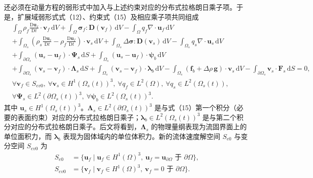 \documentclass[UTF8,11pt,a4paper]{ctexart}
\newcommand{\dd}{\,\mathrm{d}}
\newcommand{\D}{\mathrm{D}}
\begin{document}
还必须在动量方程的弱形式中加入与上述约束对应的分布式拉格朗日乘子项。于是，扩展域弱形式式（12）、约束式（15）及相应乘子项共同组成
\begin{align}
&\int_{\Omega}\rho_f\frac{\D\bm u_f}{\D t}\cdot\bm v_f\dd V
+\int_{\Omega}\bm\sigma_f:\bm D(\bm v_f)\dd V
-\int_{\Omega}q_f\nabla\cdot\bm u_f\dd V \nonumber\\
&+\int_{\Omega_s}\left(\rho_s\frac{\D\bm u_s}{\D t}-\rho_f\frac{\D\bm u_f}{\D t}\right)\cdot\bm v_s\dd V
+\int_{\Omega_s}\Delta\bm\sigma:\bm D(\bm v_s)\dd V
-\int_{\Omega_s}q_s\nabla\cdot\bm u_s\dd V \nonumber\\
&+\int_{\partial\Omega_s}(\bm u_s-\bm u_f)\cdot\bm\Psi_s\dd S
+\int_{\Omega_s}(\bm u_s-\bm u_f)\cdot\bm\psi_b\dd V \\[-0.3em]
&+\int_{\partial\Omega_s}(\bm v_s-\bm v_f)\cdot\bm\Lambda_s\dd S
+\int_{\Omega_s}(\bm v_s-\bm v_f)\cdot\bm\lambda_b\dd V
-\int_{\Omega_s}(\bm f_b+\Delta\rho\,\bm g)\cdot\bm v_s\dd V
-\int_{\partial\Omega_s}\bm v_s\cdot\bm F_s\dd S=0, \nonumber\\[-0.2em]
&\forall\bm v_f\in S_{ev0},\ \forall\bm v_s\in H^1(\Omega_s(t))^3,\ \forall q_f\in L^2(\Omega),\ \forall q_s\in L^2(\Omega_s(t)),\nonumber\\
&\forall\bm\Psi_s\in L^2(\partial\Omega_s(t))^3,\ \forall\bm\psi_b\in L^2(\Omega_s(t))^3. \tag{16}
\end{align}
其中 $\bm u_s\in H^1(\Omega_s(t))^3$。$\bm\Lambda_s\in L^2(\partial\Omega_s(t))^3$ 是与式（15）第一个积分（必要的表面约束）对应的分布式拉格朗日乘子；$\bm\lambda_b\in L^2(\Omega_s(t))^3$ 是与第二个积分对应的分布式拉格朗日乘子。后文将看到，$\bm\Lambda_s$ 的物理量纲表现为流固界面上的单位面积力，而 $\bm\lambda_b$ 表现为固体域内的单位体积力。新的流体速度解空间 $S_{e0}$ 与变分空间 $S_{ev0}$ 为
\begin{align}
S_{e0}&=\{\bm u_f\mid \bm u_f\in H^1(\Omega)^3,\ \bm u_f=\bm u_{\partial\Omega}\text{ 于 }\partial\Omega\}, \tag{17}\\
S_{ev0}&=\{\bm v_f\mid \bm v_f\in H^1(\Omega)^3,\ \bm v_f=0\text{ 于 }\partial\Omega\}. \tag{18}
\end{align}
\end{document}
